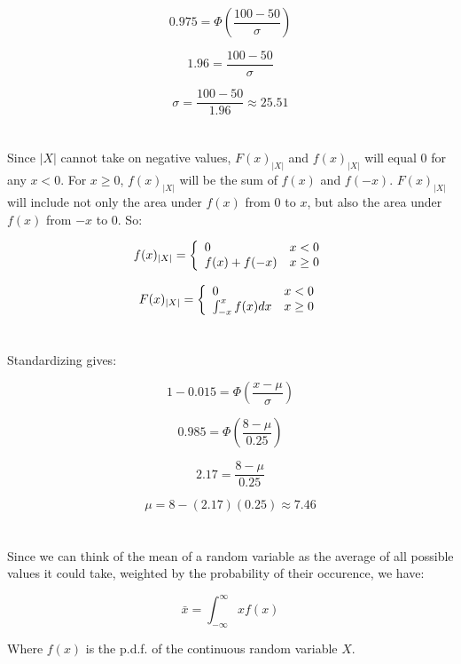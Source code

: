 \documentclass{article}
\begin{document}
\[
0.975 = \Phi \left( \frac{100 - 50}{\sigma} \right)
\]

\[
1.96 = \frac{100-50}{\sigma}
\]

\[
\sigma = \frac{100-50}{1.96} \approx 25.51
\]

\section{}
Since $|X|$ cannot take on negative values, $F(x)_{|X|}$ and $f(x)_{|X|}$ will
equal 0 for any $x < 0$. For $x \ge 0$, $f(x)_{|X|}$ will be the sum of $f(x)$
and $f(-x)$. $F(x)_{|X|}$ will include not only the area under $f(x)$ from
0 to $x$, but also the area under $f(x)$ from $-x$ to 0. So:

\[
f(x)_{|X|} = \left\{
\begin{array}{l l}
0 & x < 0\\
f(x) + f(-x) & x \ge 0\\
\end{array} \right.
\]

\[
F(x)_{|X|} = \left\{
\begin{array}{l l}
0 & x < 0\\
\int_{-x}^{x} f(x) dx & x \ge 0\\
\end{array} \right.
\]

\section{}
Standardizing gives:

\[
1 - 0.015 = \Phi \left( \frac{x-\mu}{\sigma} \right)
\]

\[
0.985 = \Phi \left( \frac{8-\mu}{0.25} \right)
\]

\[
2.17 = \frac{8-\mu}{0.25}
\]

\[
\mu = 8-(2.17)(0.25) \approx 7.46
\]

\section{}
Since we can think of the mean of a random variable as the average of all
possible values it could take, weighted by the probability of their occurence,
we have:

\[
\bar{x} = \int_{-\infty}^{\infty} xf(x)
\]

Where $f(x)$ is the p.d.f. of the continuous random variable $X$.
\end{document}
